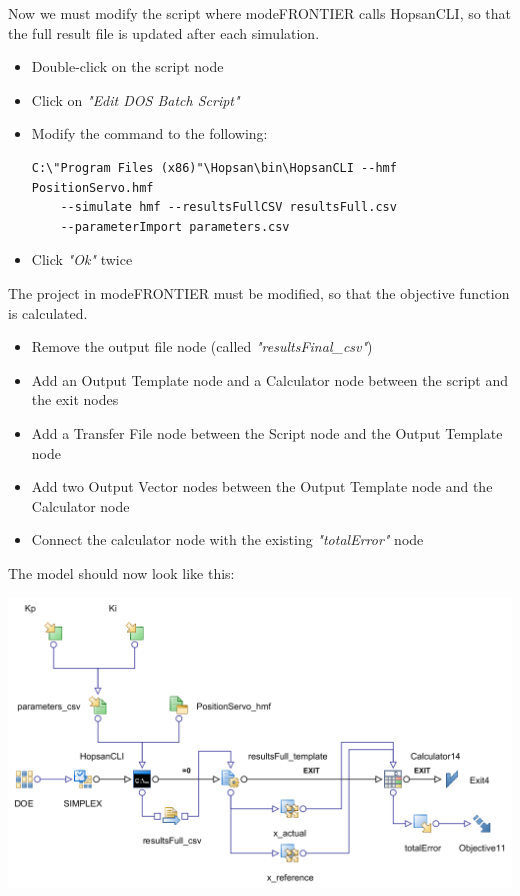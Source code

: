 \documentclass[a4paper]{article}
\begin{document}
\begin{tutenumerate}
\begin{enumerate}
Now we must modify the script where modeFRONTIER calls HopsanCLI, so that the full result file is updated after each simulation.
\begin{itemize}
\item Double-click on the script node


\item Click on \textit{"Edit DOS Batch Script"}
\item Modify the command to the following:
\begin{lstlisting}[basicstyle=\footnotesize\ttfamily, breaklines=true]
C:\"Program Files (x86)"\Hopsan\bin\HopsanCLI --hmf PositionServo.hmf
    --simulate hmf --resultsFullCSV resultsFull.csv 
    --parameterImport parameters.csv
\end{lstlisting}
\item Click \textit{"Ok"} twice
\end{itemize}

The project in modeFRONTIER must be modified, so that the objective function is calculated. 
\begin{itemize}
\item Remove the output file node (called \textit{"resultsFinal\_csv"})
\item Add an Output Template node and a Calculator node between the script and the exit nodes
\item Add a Transfer File node between the Script node and the Output Template node
\item Add two Output Vector nodes between the Output Template node and the Calculator node
\item Connect the calculator node with the existing \textit{"totalError"} node
\end{itemize}

The model should now look like this:

\begin{center}
\includegraphics[scale=0.52]{gfx/modefrontier/model_full.png}
\end{center}



\end{enumerate}
\end{tutenumerate}
\end{document}
